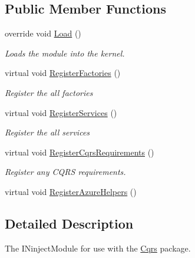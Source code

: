 \subsection*{Public Member Functions}
\begin{DoxyCompactItemize}
\item 
override void \hyperlink{classCqrs_1_1Ninject_1_1Azure_1_1DocumentDb_1_1Configuration_1_1TestAzureDocumentDbModule_a88bb55534346355d3cf206a3bc8fa9c5_a88bb55534346355d3cf206a3bc8fa9c5}{Load} ()
\begin{DoxyCompactList}\small\item\em Loads the module into the kernel. \end{DoxyCompactList}\item 
virtual void \hyperlink{classCqrs_1_1Ninject_1_1Azure_1_1DocumentDb_1_1Configuration_1_1TestAzureDocumentDbModule_a903d7c2fc23d846f14024a8b83dd4a8f_a903d7c2fc23d846f14024a8b83dd4a8f}{Register\+Factories} ()
\begin{DoxyCompactList}\small\item\em Register the all factories \end{DoxyCompactList}\item 
virtual void \hyperlink{classCqrs_1_1Ninject_1_1Azure_1_1DocumentDb_1_1Configuration_1_1TestAzureDocumentDbModule_aff24a0011b81f9db1a0509f712b791a4_aff24a0011b81f9db1a0509f712b791a4}{Register\+Services} ()
\begin{DoxyCompactList}\small\item\em Register the all services \end{DoxyCompactList}\item 
virtual void \hyperlink{classCqrs_1_1Ninject_1_1Azure_1_1DocumentDb_1_1Configuration_1_1TestAzureDocumentDbModule_a6e66e5334da9a6bea845f0abe05e2e76_a6e66e5334da9a6bea845f0abe05e2e76}{Register\+Cqrs\+Requirements} ()
\begin{DoxyCompactList}\small\item\em Register any C\+Q\+RS requirements. \end{DoxyCompactList}\item 
virtual void \hyperlink{classCqrs_1_1Ninject_1_1Azure_1_1DocumentDb_1_1Configuration_1_1TestAzureDocumentDbModule_aae0cd0fea632ed53dcc430aaf972de22_aae0cd0fea632ed53dcc430aaf972de22}{Register\+Azure\+Helpers} ()
\end{DoxyCompactItemize}


\subsection{Detailed Description}
The I\+Ninject\+Module for use with the \hyperlink{namespaceCqrs}{Cqrs} package. 



